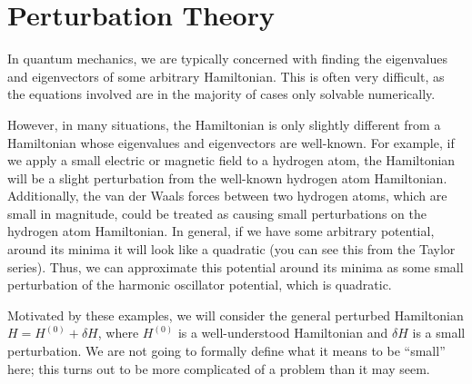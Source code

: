 \section{Perturbation Theory}
In quantum mechanics, we are typically concerned with finding the eigenvalues and eigenvectors of some arbitrary Hamiltonian. This is often very difficult, as the equations involved are in the majority of cases only solvable numerically. 

However, in many situations, the Hamiltonian is only slightly different from a Hamiltonian whose eigenvalues and eigenvectors are well-known. For example, if we apply a small electric or magnetic field to a hydrogen atom, the Hamiltonian will be a slight perturbation from the well-known hydrogen atom Hamiltonian. Additionally, the van der Waals forces between two hydrogen atoms, which are small in magnitude, could be treated as causing small perturbations on the hydrogen atom Hamiltonian. In general, if we have some arbitrary potential, around its minima it will look like a quadratic (you can see this from the Taylor series). Thus, we can approximate this potential around its minima as some small perturbation of the harmonic oscillator potential, which is quadratic.

Motivated by these examples, we will consider the general perturbed Hamiltonian $H = H^{(0)} + \delta H$, where $H^{(0)}$ is a well-understood Hamiltonian and $\delta H$ is a small perturbation. We are not going to formally define what it means to be ``small'' here; this turns out to be more complicated of a problem than it may seem.




